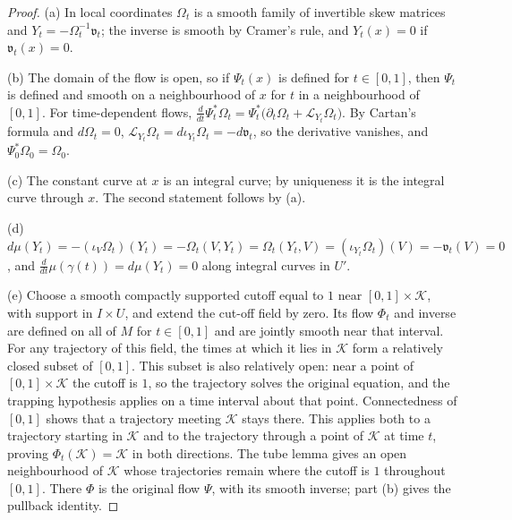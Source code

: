 \begin{proof}
(a) In local coordinates $\Omega_t$ is a smooth family of invertible skew matrices and $Y_t=-\Omega_t^{-1}\mathfrak v_t$; the
inverse is smooth by Cramer's rule, and $Y_t(x)=0$ if $\mathfrak v_t(x)=0$.

(b) The domain of the flow is open, so if $\Psi_t(x)$ is defined for $t\in[0,1]$, then $\Psi_t$ is defined and smooth on a
neighbourhood of $x$ for $t$ in a neighbourhood of $[0,1]$. For time-dependent flows,
$\frac d{dt}\Psi_t^*\Omega_t=\Psi_t^*\big(\partial_t\Omega_t+\mathcal L_{Y_t}\Omega_t\big)$. By Cartan's formula and $d\Omega_t=0$,
$\mathcal L_{Y_t}\Omega_t=d\iota_{Y_t}\Omega_t=-d\mathfrak v_t$, so the derivative vanishes, and $\Psi_0^*\Omega_0=\Omega_0$.

(c) The constant curve at $x$ is an integral curve; by uniqueness it is the integral curve through $x$. The second
statement follows by (a).

(d) $d\mu(Y_t)=-(\iota_V\Omega_t)(Y_t)=-\Omega_t(V,Y_t)=\Omega_t(Y_t,V)=(\iota_{Y_t}\Omega_t)(V)=-\mathfrak v_t(V)=0$, and
$\frac d{dt}\mu(\gamma(t))=d\mu(Y_t)=0$ along integral curves in $U'$.

(e) Choose a smooth compactly supported cutoff equal to $1$ near $[0,1]\times\mathcal K$, with support in
$I\times U$, and extend the cut-off field by zero. Its flow $\Phi_t$ and inverse are defined on all of $M$
for $t\in[0,1]$ and are jointly smooth near that interval.
For any trajectory of this field, the times at which it lies in $\mathcal K$ form a relatively closed subset
of $[0,1]$. This subset is also relatively open: near a point of $[0,1]\times\mathcal K$ the cutoff is $1$,
so the trajectory solves the original equation, and the trapping hypothesis applies on a time interval
about that point. Connectedness of $[0,1]$ shows that a trajectory meeting $\mathcal K$ stays there.
This applies both to a trajectory starting in $\mathcal K$ and to the trajectory through a point of
$\mathcal K$ at time $t$, proving $\Phi_t(\mathcal K)=\mathcal K$ in both directions.
The tube lemma gives an open neighbourhood of $\mathcal K$ whose trajectories remain where the cutoff
is $1$ throughout $[0,1]$. There $\Phi$ is the original flow $\Psi$, with its smooth inverse;
part (b) gives the pullback identity.


\end{proof}
